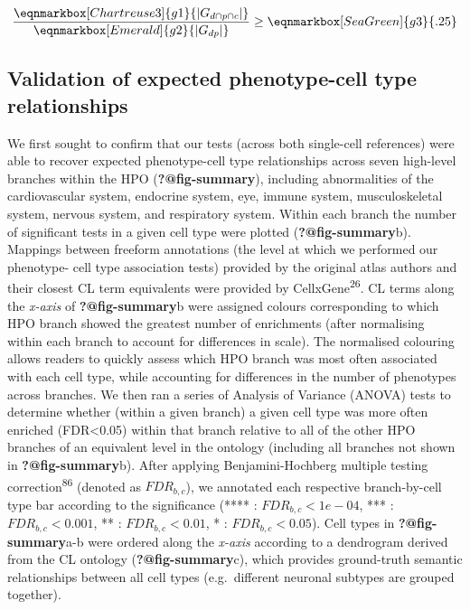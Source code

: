\documentclass[
]{report}
\begin{document}
\hfill\break

\begin{equation*}
  \frac{
     \eqnmarkbox[Chartreuse3]{g1}{|G_{d \cap p \cap c} |}
    }{
       \eqnmarkbox[Emerald]{g2}{|G_{dp}|}} 
  \geq \eqnmarkbox[SeaGreen]{g3}{.25} 
\end{equation*}

\hfill\break
\hfill\break

\subsection{Validation of expected phenotype-cell type
relationships}\label{validation-of-expected-phenotype-cell-type-relationships-1}

We first sought to confirm that our tests (across both single-cell
references) were able to recover expected phenotype-cell type
relationships across seven high-level branches within the HPO
(\textbf{?@fig-summary}), including abnormalities of the cardiovascular
system, endocrine system, eye, immune system, musculoskeletal system,
nervous system, and respiratory system. Within each branch the number of
significant tests in a given cell type were plotted
(\textbf{?@fig-summary}b). Mappings between freeform annotations (the
level at which we performed our phenotype- cell type association tests)
provided by the original atlas authors and their closest CL term
equivalents were provided by CellxGene\textsuperscript{26}. CL terms
along the \emph{x-axis} of \textbf{?@fig-summary}b were assigned colours
corresponding to which HPO branch showed the greatest number of
enrichments (after normalising within each branch to account for
differences in scale). The normalised colouring allows readers to
quickly assess which HPO branch was most often associated with each cell
type, while accounting for differences in the number of phenotypes
across branches. We then ran a series of Analysis of Variance (ANOVA)
tests to determine whether (within a given branch) a given cell type was
more often enriched (FDR\textless0.05) within that branch relative to
all of the other HPO branches of an equivalent level in the ontology
(including all branches not shown in \textbf{?@fig-summary}b). After
applying Benjamini-Hochberg multiple testing
correction\textsuperscript{86} (denoted as \(FDR _{b,c}\)), we annotated
each respective branch-by-cell type bar according to the significance
(**** : \(FDR _{b,c}<1e-04\), *** : \(FDR _{b,c}<0.001\), ** :
\(FDR _{b,c}<0.01\), * : \(FDR _{b,c}<0.05\)). Cell types in
\textbf{?@fig-summary}a-b were ordered along the \emph{x-axis} according
to a dendrogram derived from the CL ontology (\textbf{?@fig-summary}c),
which provides ground-truth semantic relationships between all cell
types (e.g.~different neuronal subtypes are grouped together).
\end{document}
